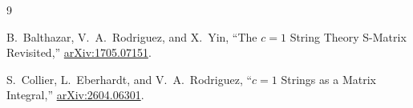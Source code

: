 \documentclass[11pt]{article}
\begin{document}
\clearpage
\begin{thebibliography}{9}

B.~Balthazar, V.~A.~Rodriguez, and X.~Yin,
``The $c=1$ String Theory S-Matrix Revisited,''
\href{https://arxiv.org/abs/1705.07151}{arXiv:1705.07151}.

S.~Collier, L.~Eberhardt, and V.~A.~Rodriguez,
``$c=1$ Strings as a Matrix Integral,''
\href{https://arxiv.org/abs/2604.06301}{arXiv:2604.06301}.

\end{thebibliography}
\end{document}
